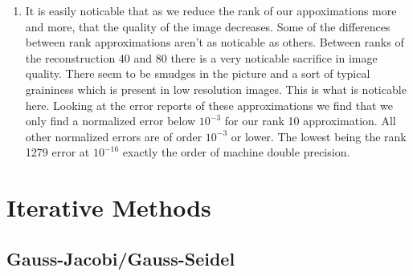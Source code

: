 \documentclass{article}
\begin{document}
\begin{enumerate}
    \item 

    It is easily noticable that as we reduce the rank of our appoximations more and more, that the quality of the image decreases. Some of the differences between rank approximations aren't as noticable as others. Between ranks of the reconstruction 40 and 80 there is a very noticable sacrifice in image quality. There seem to be smudges in the picture and a sort of typical graininess which is present in low resolution images. This is what is noticable here. Looking at the error reports of these approximations we find that we only find a normalized error below $10^{-3}$ for our rank 10 approximation. All other normalized errors are of order $10^{-3}$ or lower. The lowest being the rank 1279 error at $10^{-16}$ exactly the order of machine double precision. 

\end{enumerate}

\section{Iterative Methods}
\subsection{Gauss-Jacobi/Gauss-Seidel}
\end{document}
